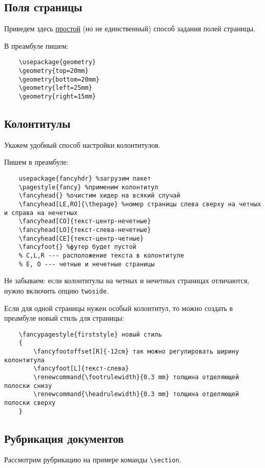 \documentclass[a4paper,11pt]{article} %
\begin{document}
\subsection{Поля страницы}

Приведем здесь \underline{простой} (но не единственный) способ задания полей страницы.

В преамбуле пишем:
\begin{verbatim}
	\usepackage{geometry}
	\geometry{top=20mm}
	\geometry{bottom=20mm}
	\geometry{left=25mm}
	\geometry{right=15mm}
\end{verbatim}

\subsection{Колонтитулы}

Укажем удобный способ настройки колонтитулов.

Пишем в преамбуле:

\begin{verbatim}
	usepackage{fancyhdr} %загрузим пакет
	\pagestyle{fancy} %применим колонтитул
	\fancyhead{} %очистим хидер на всякий случай
	\fancyhead[LE,RO]{\thepage} %номер страницы слева сверху на четных и справа на нечетных
	\fancyhead[CO]{текст-центр-нечетные}
	\fancyhead[LO]{текст-слева-нечетные} 
	\fancyhead[CE]{текст-центр-четные} 
	\fancyfoot{} %футер будет пустой
	% C,L,R --- расположение текста в колонтитуле
	% E, O --- четные и нечетные страницы
\end{verbatim}

Не забываем: если колонтитулы на четных и нечетных страницах отличаются, нужно включить опцию {\tt twoside}.

Если для одной страницы нужен особый колонтитул, то можно создать в преамбуле новый стиль для страницы:

\begin{verbatim}
	\fancypagestyle{firststyle} новый стиль
	{
		\fancyfootoffset[R]{-12cm} так можно регулировать ширину колонтитула
		\fancyfoot[L]{текст-слева}
		\renewcommand{\footrulewidth}{0.3 mm} толщина отделяющей полоски снизу
		\renewcommand{\headrulewidth}{0.3 mm} толщина отделяющей полоски сверху
	} 
\end{verbatim}

\subsection{Рубрикация документов}

Рассмотрим рубрикацию на примере команды \verb"\section".
\end{document}
